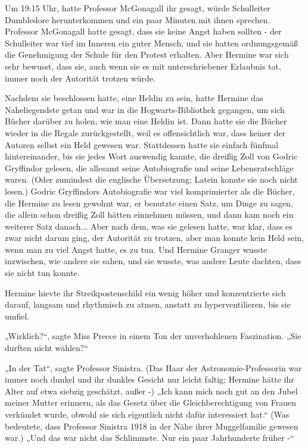 {Um 19:15 Uhr, hatte Professor McGonagall ihr gesagt, würde Schulleiter Dumbledore herunterkommen und ein paar Minuten mit ihnen sprechen. Professor McGonagall hatte gesagt, dass sie keine Angst haben sollten - der Schulleiter war tief im Inneren ein guter Mensch, und sie hatten ordnungsgemäß die Genehmigung der Schule für den Protest erhalten. Aber Hermine war sich sehr bewusst, dass sie, auch wenn sie es mit unterschriebener Erlaubnis tat, immer noch der Autorität trotzen würde.

Nachdem sie beschlossen hatte, eine Heldin zu sein, hatte Hermine das Naheliegendste getan und war in die Hogwarts-Bibliothek gegangen, um sich Bücher darüber zu holen, wie man eine Heldin ist. Dann hatte sie die Bücher wieder in die Regale zurückgestellt, weil es offensichtlich war, dass keiner der Autoren selbst ein Held gewesen war. Stattdessen hatte sie einfach fünfmal hintereinander, bis sie jedes Wort auswendig kannte, die dreißig Zoll von Godric Gryffindor gelesen, die allesamt seine Autobiografie und seine Lebensratschläge waren. (Oder zumindest die englische Übersetzung; Latein konnte sie noch nicht lesen.) Godric Gryffindors Autobiografie war viel komprimierter als die Bücher, die Hermine zu lesen gewohnt war, er benutzte einen Satz, um Dinge zu sagen, die allein schon dreißig Zoll hätten einnehmen müssen, und dann kam noch ein weiterer Satz danach... Aber nach dem, was sie gelesen hatte, war klar, dass es zwar nicht darum ging, der Autorität zu trotzen, aber man konnte kein Held sein, wenn man zu viel Angst hatte, es zu tun. Und Hermine Granger wusste inzwischen, wie andere sie sahen, und sie wusste, was andere Leute dachten, dass sie nicht tun konnte.

Hermine hievte ihr Streikpostenschild ein wenig höher und konzentrierte sich darauf, langsam und rhythmisch zu atmen, anstatt zu hyperventilieren, bis sie umfiel.

„Wirklich?“, sagte Miss Preece in einem Ton der unverhohlenen Faszination. „Sie durften nicht wählen?“

„In der Tat“, sagte Professor Sinistra. (Das Haar der Astronomie-Professorin war immer noch dunkel und ihr dunkles Gesicht nur leicht faltig; Hermine hätte ihr Alter auf etwa siebzig geschätzt, außer -) „Ich kann mich noch gut an den Jubel meiner Mutter erinnern, als das Gesetz über die Gleichberechtigung von Frauen verkündet wurde, obwohl sie sich eigentlich nicht dafür interessiert hat.“ (Was bedeutete, dass Professor Sinistra 1918 in der Nähe ihrer Muggelfamilie gewesen war.) „Und das war nicht das Schlimmste. Nur ein paar Jahrhunderte früher -“

}
